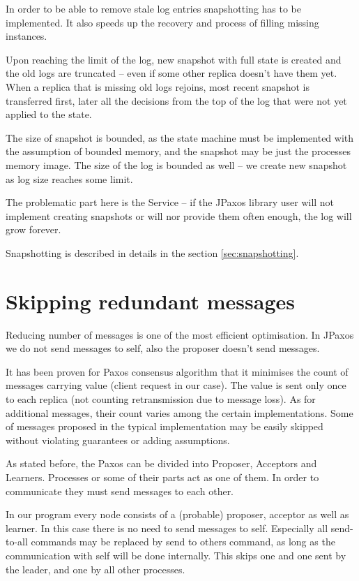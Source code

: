 In order to be able to remove stale log entries snapshotting has to be implemented. It also speeds up the recovery and process of filling missing instances.

Upon reaching the limit of the log, new snapshot with full state is created and the old logs are truncated -- even if some other replica doesn't have them yet. When a replica that is missing old logs rejoins, most recent snapshot is transferred first, later all the decisions from the top of the log that were not yet applied to the state.

The size of snapshot is bounded, as the state machine must be implemented with the assumption of bounded memory, and the snapshot may be just the processes memory image. The size of the log is bounded as well -- we create new snapshot as log size reaches some limit.

The problematic part here is the Service -- if the JPaxos library user will not implement creating snapshots or will nor provide them often enough, the log will grow forever.

Snapshotting is described in details in the section \ref{sec:snapshotting}.

\section{Skipping redundant messages}
Reducing number of messages is one of the most efficient optimisation. In JPaxos we do not send messages to self, also the proposer doesn't send \accept messages.

It has been proven for Paxos consensus algorithm that it minimises the count of messages carrying value (client request in our case). The value is sent only once to each replica (not counting retransmission due to message loss). As for additional messages, their count varies among the certain implementations. Some of messages proposed in the typical implementation may be easily skipped without violating guarantees or adding assumptions.


As stated before, the Paxos can be divided into Proposer, Acceptors and Learners. Processes or some of their parts act as one of them. In order to communicate they must send messages to each other.

In our program every node consists of a (probable) proposer, acceptor as well as learner. In this case there is no need to send messages to self. Especially all send-to-all commands may be replaced by send to others command, as long as the communication with self will be done internally. This skips one \accept and one \propose sent by the leader, and one \accept by all other processes.

